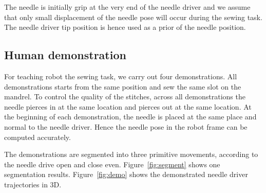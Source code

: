 The needle is initially grip at the very end of the needle driver and we assume that only small displacement of the needle pose will occur during the sewing task. The needle driver tip position is hence used as a prior of the needle position.

\subsection{Human demonstration}
For teaching robot the sewing task, we carry out four demonstrations. All demonstrations starts from the same position and sew the same slot on the mandrel. To control the quality of the stitches, across all demonstrations the needle pierces in at the same location and pierces out at the same location. At the beginning of each demonstration, the needle is placed at the same place and normal to the needle driver. Hence the needle pose in the robot frame can be computed accurately.

The demonstrations are segmented into three primitive movements, according to the needle drive open and close even. Figure~\ref{fig:segment} shows one segmentation results. Figure~\ref{fig:demo} shows the demonstrated needle driver trajectories in 3D.

\begin{figure}
\end{figure}


